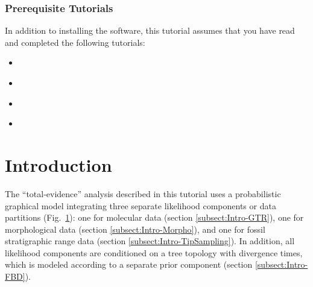 \subsubsection{Prerequisite Tutorials}
In addition to installing the software, this tutorial assumes that you have read and completed the following tutorials:
\begin{itemize}[noitemsep,topsep=0pt]
\item \href{https://github.com/revbayes/revbayes_tutorial/blob/master/tutorial_TeX/RB_Basics_Tutorial/RB_Basics_Tutorial.pdf}{}
\item \href{https://github.com/revbayes/revbayes_tutorial/blob/master/tutorial_TeX/RB_MCMC_Intro_Tutorial/RB_MCMC_Intro_Tutorial.pdf}{}
\item \href{https://github.com/revbayes/revbayes_tutorial/blob/master/tutorial_TeX/RB_CTMC_Tutorial/RB_CTMC_Tutorial.pdf}{}
\item \href{https://github.com/revbayes/revbayes_tutorial/blob/master/tutorial_TeX/RB_Partition_Tutorial/RB_Partition_Tutorial.pdf}{}
\end{itemize}


\bigskip
\section{Introduction}\label{sect:Introduction}

The ``total-evidence'' analysis described in this tutorial uses a probabilistic graphical model \citep{Hoehna2014b} integrating three separate likelihood components or data partitions (Fig.\ \ref{fig:module-gm}): one for molecular data (section \ref{subsect:Intro-GTR}), one for morphological data (section \ref{subsect:Intro-Morpho}), and one for fossil stratigraphic range data (section \ref{subsect:Intro-TipSampling}). In addition, all likelihood components are conditioned on a tree topology with divergence times, which is modeled according to a separate prior component (section \ref{subsect:Intro-FBD}).
\begin{figure}[h!]
\label{fig:module-gm}
\end{figure}

